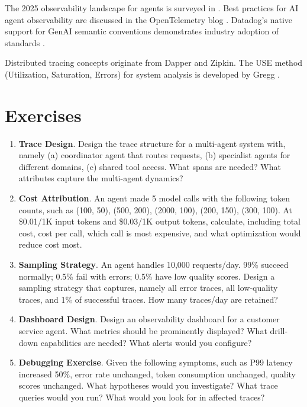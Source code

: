 The 2025 observability landscape for agents is surveyed in \cite{llmobs2025}. Best practices for AI agent observability are discussed in the OpenTelemetry blog \cite{otelagent2025}. Datadog's native support for GenAI semantic conventions demonstrates industry adoption of standards \cite{datadoggenai2025}.

Distributed tracing concepts originate from Dapper \cite{dapper2010} and Zipkin. The USE method (Utilization, Saturation, Errors) for system analysis is developed by Gregg \cite{gregg2013}.

\section*{Exercises}

\begin{enumerate}
\item \textbf{Trace Design}. Design the trace structure for a multi-agent system with, namely (a) coordinator agent that routes requests, (b) specialist agents for different domains, (c) shared tool access. What spans are needed? What attributes capture the multi-agent dynamics?

\item \textbf{Cost Attribution}. An agent made 5 model calls with the following token counts, such as (100, 50), (500, 200), (2000, 100), (200, 150), (300, 100). At \$0.01/1K input tokens and \$0.03/1K output tokens, calculate, including total cost, cost per call, which call is most expensive, and what optimization would reduce cost most.

\item \textbf{Sampling Strategy}. An agent handles 10,000 requests/day. 99\% succeed normally; 0.5\% fail with errors; 0.5\% have low quality scores. Design a sampling strategy that captures, namely all error traces, all low-quality traces, and 1\% of successful traces. How many traces/day are retained?

\item \textbf{Dashboard Design}. Design an observability dashboard for a customer service agent. What metrics should be prominently displayed? What drill-down capabilities are needed? What alerts would you configure?

\item \textbf{Debugging Exercise}. Given the following symptoms, such as P99 latency increased 50\%, error rate unchanged, token consumption unchanged, quality scores unchanged. What hypotheses would you investigate? What trace queries would you run? What would you look for in affected traces?
\end{enumerate}


